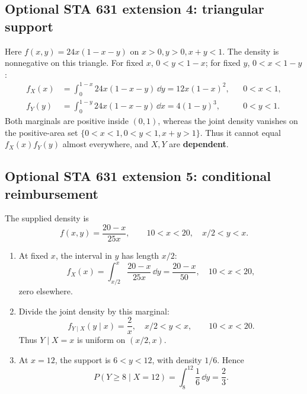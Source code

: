\subsection*{Optional STA 631 extension 4: triangular support}
Here $f(x,y)=24x(1-x-y)$ on $x>0,y>0,x+y<1$. The density is nonnegative on this triangle. For fixed $x$, $0<y<1-x$; for fixed $y$, $0<x<1-y$:
\[
\begin{aligned}
 f_X(x)&=\int_0^{1-x}24x(1-x-y)\,\dd y
 =\boxed{12x(1-x)^2},&&0<x<1,\\
 f_Y(y)&=\int_0^{1-y}24x(1-x-y)\,\dd x
 =\boxed{4(1-y)^3},&&0<y<1.
\end{aligned}
\]
Both marginals are positive inside $(0,1)$, whereas the joint density vanishes on the positive-area set $\{0<x<1,0<y<1,x+y>1\}$. Thus it cannot equal $f_X(x)f_Y(y)$ almost everywhere, and $X,Y$ are \textbf{dependent}.

\subsection*{Optional STA 631 extension 5: conditional reimbursement}
The supplied density is
\[
 f(x,y)=\frac{20-x}{25x},\qquad10<x<20,\quad x/2<y<x.
\]
\begin{enumerate}[label=(\alph*),leftmargin=*]
\item At fixed $x$, the interval in $y$ has length $x/2$:
\[
 \boxed{f_X(x)=\int_{x/2}^{x}\frac{20-x}{25x}\,\dd y
 =\frac{20-x}{50},\quad10<x<20,}
\]
zero elsewhere.
\item Divide the joint density by this marginal:
\[
 \boxed{f_{Y\mid X}(y\mid x)=\frac2x,\quad x/2<y<x,}
 \qquad10<x<20.
\]
Thus $Y\mid X=x$ is uniform on $(x/2,x)$.
\item At $x=12$, the support is $6<y<12$, with density $1/6$. Hence
\[
 \boxed{P(Y\geq8\mid X=12)=\int_8^{12}\frac16\,\dd y=\frac23}.
\]
\end{enumerate}

